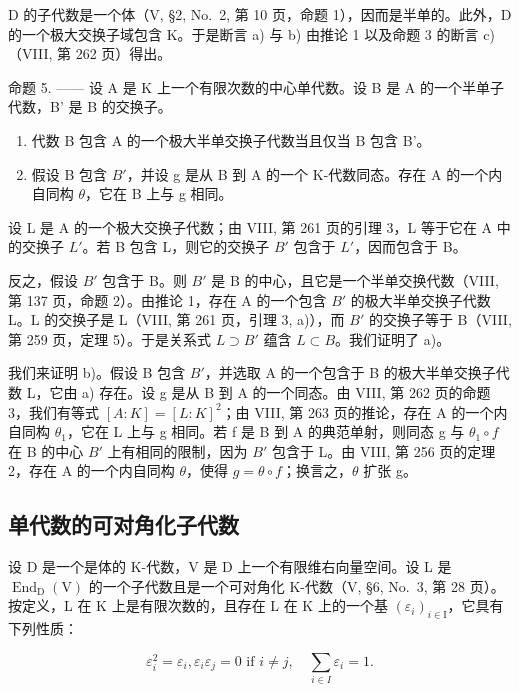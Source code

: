 D 的子代数是一个体（V, §2, No.~2, 第 10 页，命题 1），因而是半单的。此外，D 的一个极大交换子域包含 K。于是断言 a) 与 b) 由推论 1 以及命题 3 的断言 c)（VIII, 第 262 页）得出。

命题 5. —— 设 A 是 K 上一个有限次数的中心单代数。设 B 是 A 的一个半单子代数，B' 是 B 的交换子。

\begin{enumerate}
\def\labelenumi{\alph{enumi})}
\item
  代数 B 包含 A 的一个极大半单交换子代数当且仅当 B 包含 B'。
\item
  假设 B 包含 \(B'\)，并设 g 是从 B 到 A 的一个 K-代数同态。存在 A 的一个内自同构 \(\theta\)，它在 B 上与 g 相同。
\end{enumerate}

设 L 是 A 的一个极大交换子代数；由 VIII, 第 261 页的引理 3，L 等于它在 A 中的交换子 \(L'\)。若 B 包含 L，则它的交换子 \(B'\) 包含于 \(L'\)，因而包含于 B。

反之，假设 \(B'\) 包含于 B。则 \(B'\) 是 B 的中心，且它是一个半单交换代数（VIII, 第 137 页，命题 2）。由推论 1，存在 A 的一个包含 \(B'\) 的极大半单交换子代数 L。L 的交换子是 L（VIII, 第 261 页，引理 3, a)），而 \(B'\) 的交换子等于 B（VIII, 第 259 页，定理 5）。于是关系式 \(L \supset B'\) 蕴含 \(L \subset B\)。我们证明了 a)。

我们来证明 b)。假设 B 包含 \(B'\)，并选取 A 的一个包含于 B 的极大半单交换子代数 L，它由 a) 存在。设 g 是从 B 到 A 的一个同态。由 VIII, 第 262 页的命题 3，我们有等式 \([A:K]=[L:K]^{2}\)；由 VIII, 第 263 页的推论，存在 A 的一个内自同构 \(\theta_{1}\)，它在 L 上与 g 相同。若 f 是 B 到 A 的典范单射，则同态 g 与 \(\theta_{1}\circ f\) 在 B 的中心 \(B'\) 上有相同的限制，因为 \(B'\) 包含于 L。由 VIII, 第 256 页的定理 2，存在 A 的一个内自同构 \(\theta\)，使得 \(g=\theta\circ f\)；换言之，\(\theta\) 扩张 g。

\subsection{单代数的可对角化子代数}

设 D 是一个是体的 K-代数，V 是 D 上一个有限维右向量空间。设 L 是 \(\operatorname{End}_{\mathrm{D}}(\mathrm{V})\) 的一个子代数且是一个可对角化 K-代数（V, §6, No.~3, 第 28 页）。按定义，L 在 K 上是有限次数的，且存在 L 在 K 上的一个基 \((\varepsilon_{i})_{i\in\mathrm{I}}\)，它具有下列性质：

\[
\varepsilon_ {i} ^ {2} = \varepsilon_ {i}, \varepsilon_ {i} \varepsilon_ {j} = 0 \text { if } i \neq j, \quad \sum_ {i \in I} \varepsilon_ {i} = 1.
\]

